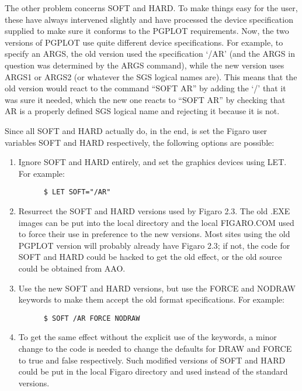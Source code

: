 The other problem concerns SOFT and HARD. To make things easy for the user,
these have always intervened slightly and have processed the device
specification supplied to make sure it conforms to the PGPLOT  requirements.
Now, the two versions of PGPLOT use quite different device specifications. For
example, to specify an ARGS, the old version used the specification `/AR' (and
the ARGS in question was determined by the ARGS command), while the new version
uses ARGS1 or ARGS2 (or whatever the SGS logical names are). This means that
the old version would react to the command ``SOFT AR'' by adding the `/' that
it  was sure it needed, which the new one reacts to ``SOFT AR'' by checking
that AR is a properly defined SGS logical name and  rejecting it because it is
not.

Since all SOFT and HARD actually do, in the end, is set the Figaro user
variables SOFT and HARD respectively, the following options are possible:

\begin{enumerate}

\item Ignore SOFT and HARD entirely, and set the graphics devices using LET.
For example:

\begin{verbatim}
      $ LET SOFT="/AR"
\end{verbatim}

\item Resurrect the SOFT and HARD versions used by Figaro 2.3. The old .EXE
images can be put into the local directory and the local FIGARO.COM used to
force their use in preference to the new  versions. Most sites using the old
PGPLOT version will probably already have Figaro 2.3; if not, the code  for
SOFT and HARD could be hacked to get the old effect, or the old source could be
obtained from AAO.


\item Use the new SOFT and HARD versions, but use the FORCE and NODRAW
keywords to make them accept the old format specifications. For example:

\begin{verbatim}
      $ SOFT /AR FORCE NODRAW
\end{verbatim}

\item To get the same effect without the explicit use of the keywords,  a minor
change to the code is needed to change the defaults for DRAW and FORCE to true
and false respectively. Such modified versions of SOFT and HARD could be put in
the local Figaro directory and used instead of the  standard versions.

\end{enumerate}

